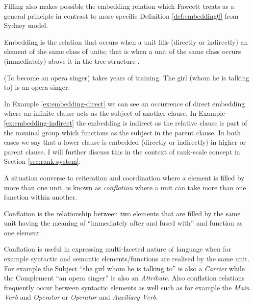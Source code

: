 Filling also makes possible the embedding relation  which Fawcett treats as a general principle in contrast to more specific Definition \ref{def:embedding0} from Sydney model.

\begin{definition}\label{def:embedding}
    Embedding is the relation that occurs when a unit fills (directly or indirectly) an element of the same class of units; that is when a unit of the same class occurs (immediately) above it in the tree structure \citep[264]{Fawcett2000}. 
\end{definition}

\begin{exe}
    \ex\label{ex:embedding-direct} (To become an opera singer) takes years of training.
    \ex\label{ex:embedding-indirect} The girl (whom he is talking to) is an opera singer.
\end{exe}

In Example \ref{ex:embedding-direct} we can see an occurrence of direct embedding where an infinite clause acts as the subject of another clause. In Example \ref{ex:embedding-indirect} the embedding is indirect as the relative clause is part of the nominal group which functions as the subject in the parent clause. In both cases we say that a lower clause is embedded (directly or indirectly) in higher or parent clause. I will further discuss this in the context of rank-scale concept in Section \ref{sec:rank-system}.

A situation converse to reiteration and coordination where a element is filled by more than one unit, is known as \textit{conflation} where a unit can take more than one function within another. 

\begin{definition}[Conflation]\label{def:conflation}
    Conflation is the relationship between two elements that are filled by the same unit having the meaning of ``immediately after and fused with'' and function as one element \citep[249--250]{Fawcett2000}. 
\end{definition}

Conflation is useful in expressing multi-faceted nature of language when for example syntactic and semantic elements/functions are realised by the same unit. For example the Subject ``the girl whom he is talking to'' is also a \textit{Carrier} while the Complement ``an opera singer'' is also an \textit{Attribute}. Also conflation relations frequently occur between syntactic elements as well such as for example the \textit{Main Verb} and \textit{Operator} or \textit{Operator} and \textit{Auxiliary Verb}.


